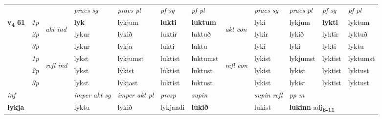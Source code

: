 \begin{longtable}[l]{X>{\footnotesize\itshape}llXXXXlXXXX}
 & &   & \textit{praes sg}  & \textit{praes pl}    & \textit{ pf sg} & \textit{pf pl} & & \textit{praes sg}  & \textit{praes pl}    & \textit{pf sg} & \textit{pf pl }  \\ \cmidrule{4-7} \cmidrule{9-12}
 \multirow{2}{*}{{{\textbf{v{\textsubscript{4}}} \Large{\textbf{61}}}}}  & 1p & \multirow{3}{*}{\begin{turn}{90}\textit{akt ind}\end{turn}} & \textbf{lyk} & lykjum & \textbf{lukti} & \textbf{luktum} & \multirow{3}{*}{\begin{turn}{90}\textit{akt con}\end{turn}} &lyki & lykjum & \textbf{lykti} & lyktum\\*
 & 2p &  &  lykur  & lykið & luktir & luktuð & & lykir & lykið & lyktir & lyktuð \\*
 & 3p &  & lykur & lykja & lukti & luktu & & lyki & lyki& lykti & lyktu \\*
\cmidrule{4-7} \cmidrule{9-12}
 & 1p & \multirow{3}{*}{\begin{turn}{90}\textit{refl ind}\end{turn}}  & lykst & lykjumst & luktist & luktumst & \multirow{3}{*}{\begin{turn}{90}\textit{refl con}\end{turn}}  &lykist & lykjumst & lyktist & lyktumst \\*
 & 2p &  & lykst & lykist & luktist & luktust & &lykist & lykist & lyktist & lyktust \\*
 & 3p  & & lykst & lykjast & luktist & luktust & & lykist & lykist& lyktist & lyktust \\*
\cmidrule{4-7} \cmidrule{9-12}

   {\textit{inf}} & &  & \textit{imper akt sg} & \textit{imper akt pl}   & \textit{presp} & \textit{supin} && \textit{supin refl} & \textit{pp m} \\*
  {\textbf{lykja}} & && lyktu  & lykið   & lykjandi &  \textbf{lukið} && lukist & \multicolumn{2}{l}{\textbf{lukinn} adj\textbf{\textsubscript{6-11}}} \\*

\midrule


\end{longtable}
